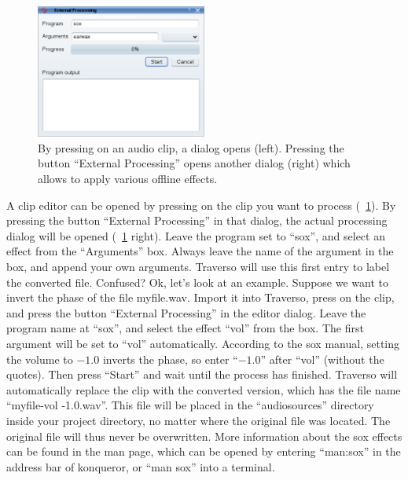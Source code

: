 \begin{figure}
	\centering
	\includegraphics[width=0.5\textwidth]{../images/external00}
	\caption{By pressing  on an audio clip, a dialog opens (left). Pressing the button ``External Processing'' opens another dialog (right) which allows to apply various offline effects.}
	\label{fig_external01}
\end{figure}

A clip editor can be opened by pressing  on the clip you want to process (\FigB~\ref{fig_external01}). By pressing the button ``External Processing'' in that dialog, the actual processing dialog will be opened (\FigB~\ref{fig_external01} right). Leave the program set to ``sox'', and select an effect from the ``Arguments'' box. Always leave the name of the argument in the box, and append your own arguments. Traverso will use this first entry to label the converted file. Confused? Ok, let's look at an example. Suppose we want to invert the phase of the file myfile.wav. Import it into Traverso, press  on the clip, and press the button ``External Processing'' in the editor dialog. Leave the program name at ``sox'', and select the effect ``vol'' from the box. The first argument will be set to ``vol'' automatically. According to the sox manual, setting the volume to $-1.0$ inverts the phase, so enter ``$-1.0$'' after ``vol'' (without the quotes). Then press ``Start'' and wait until the process has finished. Traverso will automatically replace the clip with the converted version, which has the file name ``myfile-vol -1.0.wav''. This file will be placed in the ``audiosources'' directory inside your project directory, no matter where the original file was located. The original file will thus never be overwritten. More information about the sox effects can be found in the man page, which can be opened by entering ``man:sox'' in the address bar of konqueror, or ``man sox'' into a terminal.
